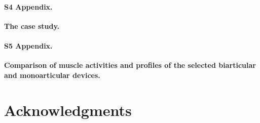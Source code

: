 \documentclass[10pt,letterpaper]{article}
\begin{document}
\paragraph*{S4 Appendix.}
\label{S4_Appendix}
{\bf The case study.}

\paragraph*{S5 Appendix.}
\label{S5_Appendix}
{\bf Comparison of muscle activities and profiles of the selected biarticular and monoarticular devices. }


\section*{Acknowledgments}

\nolinenumbers

%
%
% 


\end{document}
